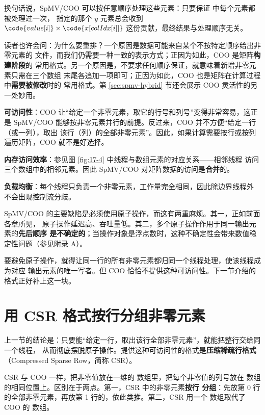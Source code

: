 换句话说，SpMV/COO 可以按任意顺序处理这些元素：只要保证  中每个元素都
被处理过一次， 指定的那个 $y$ 元素总会收到
$\code{value[i]}\times\code{x[colIdx[i]]}$ 这份贡献，最终结果与处理顺序无关。

读者也许会问：为什么要重排？一个原因是数据可能来自某个不按特定顺序给出非零元素的
文件，而我们仍需要一种一致的表示方式；正因为如此，COO 是矩阵\textbf{构建阶段}的
常用格式。另一个原因是，不要求任何顺序保证，就意味着新增非零元素只需在三个数组
末尾各追加一项即可；正因为如此，COO 也是矩阵在计算过程中\textbf{需要被修改}时的
常用格式。第 \ref{sec:spmv-hybrid} 节还会展示 COO 灵活性的另一处妙用。

\textbf{可访问性}：COO 让“给定一个非零元素，取它的行号和列号”变得非常容易，这正是
SpMV/COO 能够按非零元素并行的前提。反过来，COO 并不方便“给定一行（或一列），取出
该行（列）的全部非零元素”。因此，如果计算需要按行或按列遍历矩阵，COO 就不是好选择。

\textbf{内存访问效率}：参见图 \ref{fig:17-4} 中线程与数组元素的对应关系——相邻线程
访问三个数组中的相邻元素。因此 SpMV/COO 对矩阵数据的访问是\textbf{合并}的。

\textbf{负载均衡}：每个线程只负责一个非零元素，工作量完全相同，因此除边界线程外
不会出现控制流分歧。

SpMV/COO 的主要缺陷是必须使用原子操作，而这有两重麻烦。其一，正如前面各章所见，
原子操作延迟高、吞吐量低。其二，多个原子操作作用于同一输出元素的\textbf{先后顺序
是不确定的}；当操作对象是浮点数时，这种不确定性会带来数值稳定性问题（参见附录 A）。

要避免原子操作，就得让同一行的所有非零元素都归同一个线程处理，使该线程成为对应
输出元素的唯一写者。但 COO 恰恰不提供这种可访问性。下一节介绍的格式正好补上这一块。

\section{用 CSR 格式按行分组非零元素}
\label{sec:spmv-csr}

上一节的结论是：只要能“给定一行，取出该行全部非零元素”，就能把整行交给同一个线程，
从而彻底摆脱原子操作。提供这种可访问性的格式是\textbf{压缩稀疏行格式}
（Compressed Sparse Row，简称 CSR）。

CSR 与 COO 一样，把非零值放在一维的  数组里，把每个非零值的列号放在
 数组的相同位置上。区别在于两点。第一，CSR 中的非零元素\textbf{按行
分组}：先放第 0 行的全部非零元素，再放第 1 行的，依此类推。第二，CSR 用一个
 数组取代了 COO 的  数组。

